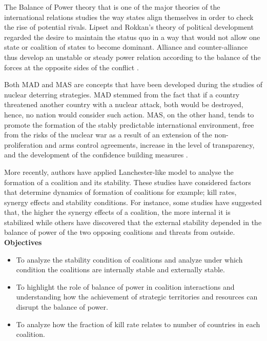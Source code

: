 \documentclass[oneside,12pt]{report}
\begin{document}
The Balance of Power theory that is one of the major theories of the international relations studies the way states align themselves in order to check the rise of potential rivals. Lipset and Rokkan’s theory of political development regarded the desire to maintain the status quo in a way that would not allow one state or coalition of states to become dominant. Alliance and counter-alliance thus develop an unstable or steady power relation according to the balance of the forces at the opposite sides of the conflict \cite{r3}.

Both MAD and MAS are concepts that have been developed during the studies of nuclear deterring strategies. MAD stemmed from the fact that if a country threatened another country with a nuclear attack, both would be destroyed, hence, no nation would consider such action. MAS, on the other hand, tends to promote the formation of the stably predictable international environment, free from the risks of the nuclear war as a result of an extension of the non-proliferation and arms control agreements, increase in the level of transparency, and the development of the confidence building measures \cite{r4}.

More recently, authors have applied Lanchester-like model to analyse the formation of a coalition and its stability. These studies have considered factors that determine dynamics of formation of coalitions for example; kill rates, synergy effects and stability conditions. For instance, some studies have suggested that, the higher the synergy effects of a coalition, the more internal it is stabilized while others have discovered that the external stability depended in the balance of power of the two opposing coalitions and threats from outside.
\\[3em]
\Large 
\textbf{Objectives}
\normalsize
\begin{itemize}
  \item To analyze the stability condition of coalitions and analyze under which condition the coalitions are internally stable and externally stable.
  \item To highlight the role of balance of power in coalition interactions and understanding how the achievement of strategic territories and resources can disrupt the balance of power.
  \item To analyze how the fraction of kill rate relates to number of countries in each coalition.\textbf{}
\end{itemize}
\end{document}
